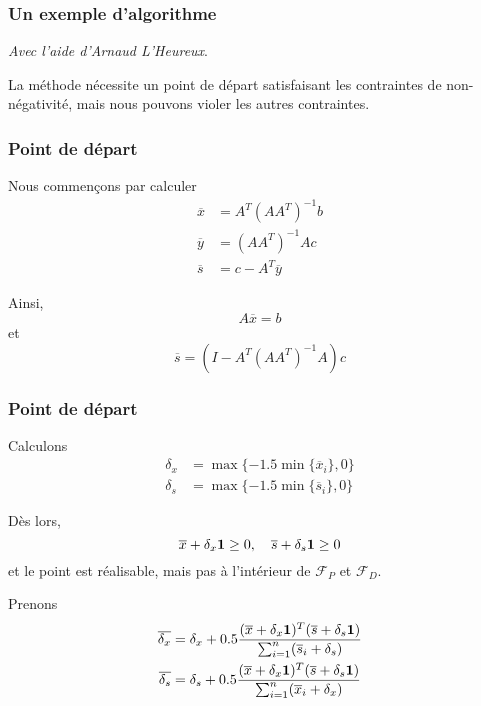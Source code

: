 \documentclass[usepdftitle=false, aspectratio=169]{beamer}
\begin{document}
\begin{frame}
\frametitle{Un exemple d'algorithme}


\mbox{}

\textit{Avec l'aide d'Arnaud L'Heureux}.

\mbox{}

La méthode nécessite un point de départ satisfaisant les contraintes de non-négativité, mais nous pouvons violer les autres contraintes.
	
\end{frame}

\begin{frame}
\frametitle{Point de départ}

Nous commençons par calculer
\begin{align*}
\overline{x} &= A^{T}(AA^{T})^{-1}b \\
\overline{y} &= (AA^{T})^{-1}Ac \\
\overline{s} &= c - A^T\overline{y}
\end{align*}

Ainsi,
$$
A\overline{x} = b
$$
et
$$
\overline{s} = (I-A^T(AA^{T})^{-1}A)c
$$

	
\end{frame}

\begin{frame}
\frametitle{Point de départ}

Calculons
\begin{align*}
\delta_x &= \max \{-1.5\min\{\overline{x}_i\}, 0 \} \\
\delta_s &= \max \{ -1.5\min\{\overline{s}_i\}, 0 \}
\end{align*}

Dès lors,
$$
	\overline{x} + \delta_x {\boldsymbol{1}} \geq 0, \quad \overline{s} + \delta_s {\boldsymbol{1}} \geq 0
$$
et le point est réalisable, mais pas à l'intérieur de $\mathcal{F}_P$ et $\mathcal{F}_D$.

Prenons
\begin{align*}
\overline{\delta_x} &= \delta_x + 0.5 \frac{(\overline{x}+\delta_x{\boldsymbol{1}})^T(\overline{s}+\delta_s{\boldsymbol{1}})}{\sum_{i=1}^n(\overline{s}_i+\delta_s)} \\
\overline{\delta_s} &= \delta_s + 0.5 \frac{(\overline{x}+\delta_x{\boldsymbol{1}})^T(\overline{s}+\delta_s{\boldsymbol{1}})}{\sum_{i=1}^n(\overline{x}_i+\delta_x)}
\end{align*}

\end{frame}
\end{document}
